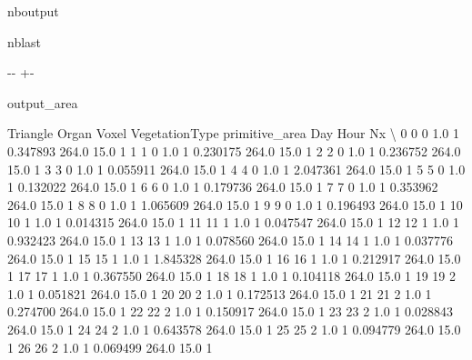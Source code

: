 \documentclass[letterpaper,10pt,english]{sphinxmanual}
\begin{document}
\begin{sphinxuseclass}{nboutput}
\begin{sphinxuseclass}{nblast}
{

\kern-\sphinxverbatimsmallskipamount\kern-\baselineskip
\kern+\FrameHeightAdjust\kern-\fboxrule
\vspace{\nbsphinxcodecellspacing}

\begin{sphinxuseclass}{output_area}
\begin{sphinxuseclass}{}


\begin{sphinxVerbatim}[commandchars=\\\{\}]
    Triangle  Organ  Voxel  VegetationType  primitive\_area    Day  Hour  Nx  \textbackslash{}
0          0      0    1.0               1        0.347893  264.0  15.0   1
1          1      0    1.0               1        0.230175  264.0  15.0   1
2          2      0    1.0               1        0.236752  264.0  15.0   1
3          3      0    1.0               1        0.055911  264.0  15.0   1
4          4      0    1.0               1        2.047361  264.0  15.0   1
5          5      0    1.0               1        0.132022  264.0  15.0   1
6          6      0    1.0               1        0.179736  264.0  15.0   1
7          7      0    1.0               1        0.353962  264.0  15.0   1
8          8      0    1.0               1        1.065609  264.0  15.0   1
9          9      0    1.0               1        0.196493  264.0  15.0   1
10        10      1    1.0               1        0.014315  264.0  15.0   1
11        11      1    1.0               1        0.047547  264.0  15.0   1
12        12      1    1.0               1        0.932423  264.0  15.0   1
13        13      1    1.0               1        0.078560  264.0  15.0   1
14        14      1    1.0               1        0.037776  264.0  15.0   1
15        15      1    1.0               1        1.845328  264.0  15.0   1
16        16      1    1.0               1        0.212917  264.0  15.0   1
17        17      1    1.0               1        0.367550  264.0  15.0   1
18        18      1    1.0               1        0.104118  264.0  15.0   1
19        19      2    1.0               1        0.051821  264.0  15.0   1
20        20      2    1.0               1        0.172513  264.0  15.0   1
21        21      2    1.0               1        0.274700  264.0  15.0   1
22        22      2    1.0               1        0.150917  264.0  15.0   1
23        23      2    1.0               1        0.028843  264.0  15.0   1
24        24      2    1.0               1        0.643578  264.0  15.0   1
25        25      2    1.0               1        0.094779  264.0  15.0   1
26        26      2    1.0               1        0.069499  264.0  15.0   1


\end{sphinxVerbatim}
\end{sphinxuseclass}
\end{sphinxuseclass}}
\end{sphinxuseclass}
\end{sphinxuseclass}
\end{document}

